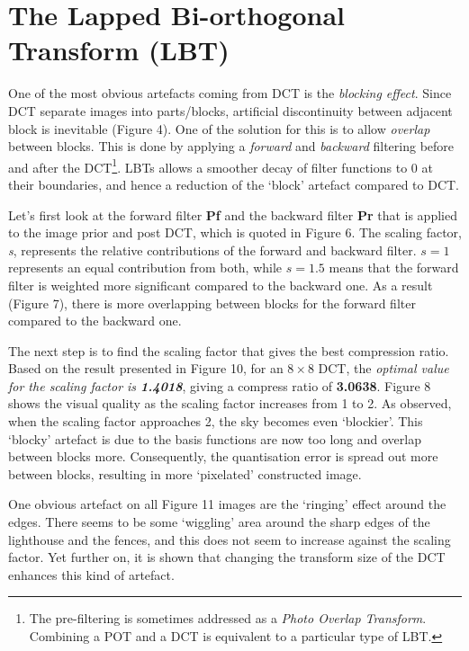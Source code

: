 \documentclass[a4paper, 11pt]{article}
\begin{document}
\section{The Lapped Bi-orthogonal Transform (LBT)}
One of the most obvious artefacts coming from DCT is the \textit{blocking effect}. Since DCT separate images into parts/blocks, artificial discontinuity between adjacent block is inevitable (Figure 4). One of the solution for this is to allow \textit{overlap} between blocks. This is done by applying a \textit{forward} and \textit{backward} filtering before and after the DCT\footnote{The pre-filtering is sometimes addressed as a \textit{Photo Overlap Transform}. Combining a POT and a DCT is equivalent to a particular type of LBT.}. LBTs allows a smoother decay of filter functions to 0 at their boundaries, and hence a reduction of the `block' artefact compared to DCT. 

Let's first look at the forward filter \textbf{Pf} and the backward filter \textbf{Pr} that is applied to the image prior and post DCT, which is quoted in Figure 6. The scaling factor, \textit{s}, represents the relative contributions of the forward and backward filter. $s = 1$ represents an equal contribution from both, while $s = 1.5$ means that the forward filter is weighted more significant compared to the backward one. As a result (Figure 7), there is more overlapping between blocks for the forward filter compared to the backward one. 

The next step is to find the scaling factor that gives the best compression ratio. Based on the result presented in Figure 10, for an $8 \times 8$ DCT, the \textit{optimal value for the scaling factor is \textbf{1.4018}}, giving a compress ratio of \textbf{3.0638}. Figure 8 shows the visual quality as the scaling factor increases from 1 to 2. As observed, when the scaling factor approaches 2, the sky becomes even `blockier'. This `blocky' artefact is due to the basis functions are now too long and overlap between blocks more. Consequently, the quantisation error is spread out more between blocks, resulting in more `pixelated' constructed image. 

One obvious artefact on all Figure 11 images are the `ringing' effect around the edges. There seems to be some `wiggling' area around the sharp edges of the lighthouse and the fences, and this does not seem to increase against the scaling factor. Yet further on, it is shown that changing the transform size of the DCT enhances this kind of artefact.
\end{document}
